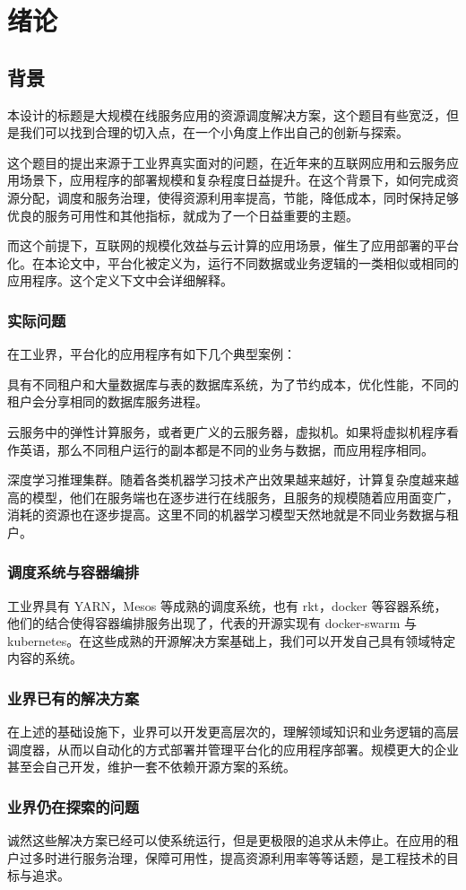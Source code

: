 
\section{绪论}

\subsection{背景}

本设计的标题是大规模在线服务应用的资源调度解决方案，这个题目有些宽泛，但是我们可以找到合理的切入点，在一个小角度上作出自己的创新与探索。

这个题目的提出来源于工业界真实面对的问题，在近年来的互联网应用和云服务应用场景下，应用程序的部署规模和复杂程度日益提升。在这个背景下，如何完成资源分配，调度和服务治理，使得资源利用率提高，节能，降低成本，同时保持足够优良的服务可用性和其他指标，就成为了一个日益重要的主题。

而这个前提下，互联网的规模化效益与云计算的应用场景，催生了应用部署的平台化。在本论文中，平台化被定义为，运行不同数据或业务逻辑的一类相似或相同的应用程序。这个定义下文中会详细解释。

\subsubsection{实际问题}

在工业界，平台化的应用程序有如下几个典型案例：

具有不同租户和大量数据库与表的数据库系统，为了节约成本，优化性能，不同的租户会分享相同的数据库服务进程。

云服务中的弹性计算服务，或者更广义的云服务器，虚拟机。如果将虚拟机程序看作英语，那么不同租户运行的副本都是不同的业务与数据，而应用程序相同。

深度学习推理集群。随着各类机器学习技术产出效果越来越好，计算复杂度越来越高的模型，他们在服务端也在逐步进行在线服务，且服务的规模随着应用面变广，消耗的资源也在逐步提高。这里不同的机器学习模型天然地就是不同业务数据与租户。

\subsubsection{调度系统与容器编排}

工业界具有 YARN，Mesos 等成熟的调度系统，也有 rkt，docker 等容器系统，他们的结合使得容器编排服务出现了，代表的开源实现有 docker-swarm 与 kubernetes。在这些成熟的开源解决方案基础上，我们可以开发自己具有领域特定内容的系统。

\subsubsection{业界已有的解决方案}

在上述的基础设施下，业界可以开发更高层次的，理解领域知识和业务逻辑的高层调度器，从而以自动化的方式部署并管理平台化的应用程序部署。规模更大的企业甚至会自己开发，维护一套不依赖开源方案的系统。

\subsubsection{业界仍在探索的问题}

诚然这些解决方案已经可以使系统运行，但是更极限的追求从未停止。在应用的租户过多时进行服务治理，保障可用性，提高资源利用率等等话题，是工程技术的目标与追求。

